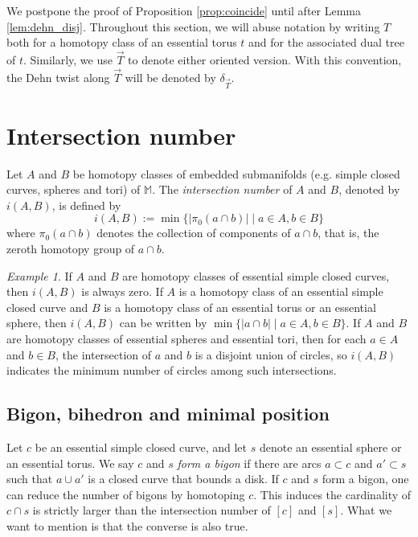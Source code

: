 \documentclass[12pt,a4paper]{amsart}
\numberwithin{equation}{section}
\newcommand{\MM}{\mathbb{M}}
\theoremstyle{plain}
\theoremstyle{definition}
\theoremstyle{remark}
\newtheorem{example}[theorem]{Example}
\begin{document}
We postpone the proof of Proposition \ref{prop:coincide} until after Lemma \ref{lem:dehn_disj}.
Throughout this section, we will abuse notation by writing $T$ both for a homotopy class of an essential torus $t$ and for the associated dual tree of $t$.
Similarly, we use $\vec T$ to denote either oriented version.
With this convention, the Dehn twist along $\vec T$ will be denoted by $\delta_{\vec T}$.






\section{Intersection number}







Let $A$ and $B$ be homotopy classes of embedded submanifolds (e.g. simple closed curves, spheres and tori) of $\MM$.
The \emph{intersection number} of $A$ and $B$, denoted by $i(A, B)$, is defined by \[i(A, B) := \min \{ \lvert \pi_0(a \cap b) \rvert \mid a \in A, b \in B \} \]
where $\pi_0(a\cap b)$ denotes the collection of components of $a \cap b$, that is, the zeroth homotopy group of $a \cap b$.

\begin{example}
    If $A$ and $B$ are homotopy classes of essential simple closed curves, then $i(A, B)$ is always zero.
    If $A$ is a homotopy class of an essential simple closed curve and $B$ is a homotopy class of an essential torus or an essential sphere, then $i(A, B)$ can be written by $\min \{ \lvert a \cap b \rvert \mid a \in A, b \in B \}$.
    If $A$ and $B$ are homotopy classes of essential spheres and essential tori, then for each $a \in A$ and $b \in B$, the intersection of $a$ and $b$ is a disjoint union of circles, so $i(A, B)$ indicates the minimum number of circles among such intersections.
\end{example}


\subsection{Bigon, bihedron and minimal position}

Let $c$ be an essential simple closed curve, and let $s$ denote an essential sphere or an essential torus.
We say $c$ and $s$ \emph{form a bigon} if there are arcs $a \subset c$ and $a' \subset s$ such that $a \cup a'$ is a closed curve that bounds a disk.
If $c$ and $s$ form a bigon, one can reduce the number of bigons by homotoping $c$.
This induces the cardinality of $c \cap s$ is strictly larger than the intersection number of $[c]$ and $[s]$.
What we want to mention is that the converse is also true.
\end{document}
